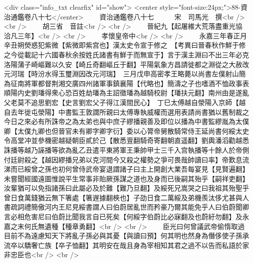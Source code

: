 <div class="info_txt clearfix" id="show">
<center style="font-size:24px;">88-資治通鑑卷八十七</center>
  　　資治通鑑卷八十七　　　宋　司馬光　撰<br />
<br />
　　胡三省　音註<br />
<br />
　　晉紀九【起屠維大荒落盡重光協洽凡三年】<br />
<br />
　　孝懷皇帝中<br />
<br />
　　永嘉三年春正月辛丑朔熒惑犯紫微【紫微即紫宫也】漢太史令宣于修之　【考異曰晉春秋作鮮于修之今從載記十六國春秋余按姓氏諸書有鮮于而無宣于】言于漢主淵曰不出三年必克洛陽蒲子崎嶇難以久安【崎丘奇翻嶇丘于翻】平陽氣象方昌請徙都之淵從之大赦改元河瑞【時汾水得玉璽淵因改元河瑞】　三月戊申高密孝王略薨以尚書左僕射山簡為征南將軍都督荆湘交廣四州諸軍事鎮襄陽【代略也】簡濤之子也嗜酒不恤政事表順陽内史劉璠得衆心恐百姓劫璠為主詔徵璠為越騎校尉【璠扶元翻】南州由是遂亂父老莫不追思劉宏【史言劉宏父子得江漢間民心】　丁巳太傅越自滎陽入京師【越自去年徙屯滎陽】中書監王敦謂所親曰太傅專執威權而選用表請尚書猶以舊制裁之今日之來必有所誅帝之為太弟也與中庶子繆播親善及即位以播為中書監繆胤為太僕卿【太僕九卿也但晉官未有卿字卿字衍】委以心膂帝舅散騎常侍王延尚書何綏太史令高堂冲並參機密越疑朝臣貳於己【散悉亶翻騎奇寄翻朝直遥翻】劉輿潘滔勸越悉誅播等越乃誣播等欲為亂乙丑遣平東將軍王秉帥甲士三千入宫執播等十餘人於帝側付廷尉殺之【越因繆播兄弟以克河間今又殺之權勢之爭可畏哉帥讀曰率】帝歎息流涕而已綏曾之孫也初何曾侍武帝宴退謂諸子曰主上開創大業吾每宴見【見賢遍翻】未嘗聞經國遠圖惟說平生常事非貽厥孫謀之道也及身而已後嗣其殆乎【嗣祥吏翻】汝輩猶可以免指諸孫曰此屬必及於難【難乃旦翻】及綏死兄嵩哭之曰我祖其殆聖乎曾日食萬錢猶云無下箸處【箸遟據翻梜也】子劭日食二萬綏及弟機羨汰侈尤甚與人書疏詞禮簡傲河内王尼見綏書謂人曰伯蔚居亂世而矜豪乃爾其能免乎人曰伯蔚聞卿言必相危害尼曰伯蔚比聞我言自已死矣【何綏字伯蔚比必寐翻及也蔚紆勿翻】及永嘉之末何氏無遺種【種章勇翻】<br />
<br />
　　臣光曰何曾議武帝偷惰取過目前不為遠慮知天下將亂子孫必與其憂【與讀曰預】何其明也然身為僭侈使子孫承流卒以驕奢亡族【卒子恤翻】其明安在哉且身為宰相知其君之過不以告而私語於家非忠臣也<br />
<br />
